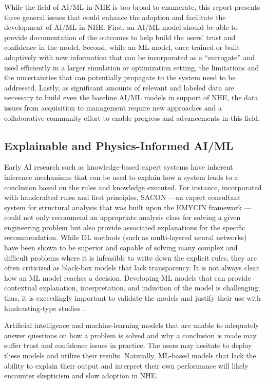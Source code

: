 While the field of AI/ML in NHE is too broad to enumerate, this report presents three general issues that could enhance the adoption and facilitate the development of AI/ML in NHE. First, an AI/ML model should be able to provide documentation of the outcomes to help build the users' trust and confidence in the model. Second, while an ML model, once trained or built adaptively with new information that can be incorporated as a ``surrogate'' and used efficiently in a larger simulation or optimization setting, the limitations and the uncertainties that can potentially propagate to the system need to be addressed. Lastly, as significant amounts of relevant and labeled data are necessary to build even the baseline AI/ML models in support of NHE, the data issues from acquisition to management require new approaches and a collaborative community effort to enable progress and advancements in this field. 

\subsection{Explainable and Physics-Informed AI/ML}

Early AI research such as knowledge-based expert systems have inherent inference mechanisms that can be used to explain how a system leads to a conclusion based on the rules and knowledge executed. For instance, incorporated with handcrafted rules and first principles, SACON \citep{bennett1978sacon}---an expert consultant system for structural analysis that was built upon the EMYCIN framework \citep{vanmelle1984emycin}---could not only recommend an appropriate analysis class for solving a given engineering problem but also provide associated explanations for the specific recommendation. While DL methods (such as multi-layered neural networks) have been shown to be superior and capable of solving many complex and difficult problems where it is infeasible to write down the explicit rules, they are often criticized as black-box models that lack transparency. It is not always clear how an ML model reaches a decision. Developing ML models that can provide contextual explanation, interpretation, and induction of the model is challenging; thus, it is exceedingly important to validate the models and justify their use with hindcasting-type studies \citep{darpa2016explainable, samek2019explainable, rudin2019why}.

Artificial intelligence and machine-learning models that are unable to adequately answer questions on how a problem is solved and why a conclusion is made may suffer trust and confidence issues in practice. The users may hesitate to deploy these models and utilize their results. Naturally, ML-based models that lack the ability to explain their output and interpret their own performance will likely encounter skepticism and slow adoption in NHE. 

